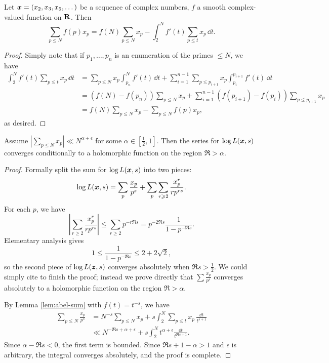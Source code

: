 \begin{lemma}\label{lem:abel-sum}
Let ${\boldsymbol x}=(x_2,x_3,x_5,\dots)$ be a sequence of complex numbers, $f$ a smooth 
complex-valued function on $\mathbf{R}$. Then 
\[
	\sum_{p\leqslant N} f(p) x_p = f(N) \sum_{p\leqslant N} x_p - \int_2^N f'(t) \sum_{p\leqslant t} x_p\, \dd t .
\]
\end{lemma}
\begin{proof}
Simply note that if $p_1,\dots,p_n$ is an enumeration of the primes 
$\leqslant N$, we have 
\begin{align*}
	\int_2^N f'(t) \sum_{p\leqslant t} x_p\, \dd t 
		&= \sum_{p\leqslant N} x_p \int_{p_n}^N f'(t)\, \dd t + \sum_{i=1}^{n-1} \sum_{p\leqslant p_{i+1}} x_p \int_{p_i}^{p_{i+1}} f'(t)\, \dd t \\
		&= \left(f(N) - f(p_n)\right) \sum_{p\leqslant N} x_p + \sum_{i=1}^{n-1} \left(f(p_{i+1}) - f(p_i)\right) \sum_{p\leqslant p_{i+1}} x_p \\
		&= f(N) \sum_{p\leqslant N} x_p - \sum_{p\leqslant N} f(p) x_p ,
\end{align*}
as desired. 
\end{proof}

\begin{theorem}\label{thm:AT->RH}
Assume $|\sum_{p\leqslant N} x_p| \ll N^{\alpha+\epsilon}$ for some 
$\alpha\in [\frac 1 2,1]$. Then the series for $\log L({\boldsymbol x},s)$ converges 
conditionally to a holomorphic function on the region $\Re > \alpha$. 
\end{theorem}
\begin{proof}
Formally split the sum for $\log L({\boldsymbol x},s)$ into two pieces: 
\[
	\log L({\boldsymbol x},s) = \sum_p \frac{x_p}{p^s} + \sum_p \sum_{r\geqslant 2} \frac{x_p^r}{r p^{r s}} .
\]
For each $p$, we have 
\[
	\left| \sum_{r\geqslant 2} \frac{x_p^r}{r p^{r s}}\right| \leqslant \sum_{r\geqslant 2} p^{- r \Re s} = p^{-2 \Re s} \frac{1}{1-p^{-\Re s}} .
\]
Elementary analysis gives 
\[
	1 \leqslant \frac{1}{1-p^{-\Re s}} \leqslant 2 + 2\sqrt 2 ,
\]
so the second piece of $\log L({\boldsymbol z},s)$ converges absolutely when 
$\Re s>\frac 1 2$. We could simply cite \cite[II.1 Th.~10]{tenenbaum-1995} to 
finish the proof; 
instead we prove directly that $\sum \frac{x_p}{p^s}$ converges absolutely 
to a holomorphic function on the region $\Re > \alpha$. 

By Lemma \ref{lem:abel-sum} with $f(t) = t^{-s}$, we have 
\begin{align*}
	\sum_{p\leqslant N} \frac{x_p}{p^s}
		&= N^{-s} \sum_{p\leqslant N} x_p + s \int_2^N \sum_{p\leqslant t} x_p\, \frac{\dd t}{t^{s+1}} \\
		&\ll N^{-\Re s + \alpha + \epsilon} + s \int_2^N t^{\alpha+\epsilon} \frac{\dd t}{t^{\Re s+1}} .
\end{align*}
Since $\alpha-\Re s < 0$, the first term is bounded. Since 
$\Re s+1-\alpha > 1$ and 
$\epsilon$ is arbitrary, the integral converges absolutely, and the proof is 
complete. 
\end{proof}

